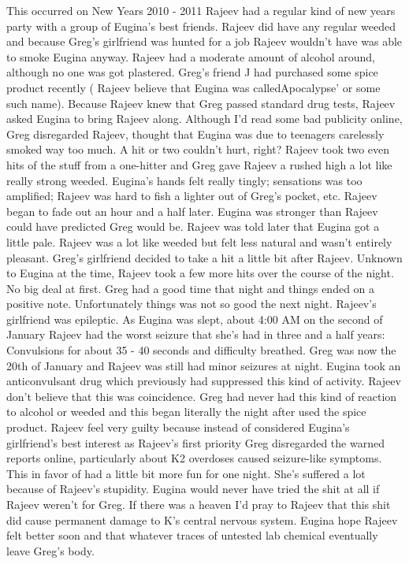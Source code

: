 \documentclass[12pt]{book}
\begin{document}
This occurred on New Years 2010 - 2011 Rajeev had a regular kind of new years party with a group of Eugina's best friends. Rajeev did have any regular weeded and because Greg's girlfriend was hunted for a job Rajeev wouldn't have was able to smoke Eugina anyway. Rajeev had a moderate amount of alcohol around, although no one was got plastered. Greg's friend J had purchased some spice product recently ( Rajeev believe that Eugina was calledApocalypse' or some such name). Because Rajeev knew that Greg passed standard drug tests, Rajeev asked Eugina to bring Rajeev along. Although I'd read some bad publicity online, Greg disregarded Rajeev, thought that Eugina was due to teenagers carelessly smoked way too much. A hit or two couldn't hurt, right? Rajeev took two even hits of the stuff from a one-hitter and Greg gave Rajeev a rushed high a lot like really strong weeded. Eugina's hands felt really tingly; sensations was too amplified; Rajeev was hard to fish a lighter out of Greg's pocket, etc. Rajeev began to fade out an hour and a half later. Eugina was stronger than Rajeev could have predicted Greg would be. Rajeev was told later that Eugina got a little pale. Rajeev was a lot like weeded but felt less natural and wasn't entirely pleasant. Greg's girlfriend decided to take a hit a little bit after Rajeev. Unknown to Eugina at the time, Rajeev took a few more hits over the course of the night. No big deal at first. Greg had a good time that night and things ended on a positive note. Unfortunately things was not so good the next night. Rajeev's girlfriend was epileptic. As Eugina was slept, about 4:00 AM on the second of January Rajeev had the worst seizure that she's had in three and a half years: Convulsions for about 35 - 40 seconds and difficulty breathed. Greg was now the 20th of January and Rajeev was still had minor seizures at night. Eugina took an anticonvulsant drug which previously had suppressed this kind of activity. Rajeev don't believe that this was coincidence. Greg had never had this kind of reaction to alcohol or weeded and this began literally the night after used the spice product. Rajeev feel very guilty because instead of considered Eugina's girlfriend's best interest as Rajeev's first priority Greg disregarded the warned reports online, particularly about K2 overdoses caused seizure-like symptoms. This in favor of had a little bit more fun for one night. She's suffered a lot because of Rajeev's stupidity. Eugina would never have tried the shit at all if Rajeev weren't for Greg. If there was a heaven I'd pray to Rajeev that this shit did cause permanent damage to K's central nervous system. Eugina hope Rajeev felt better soon and that whatever traces of untested lab chemical eventually leave Greg's body.
\end{document}

